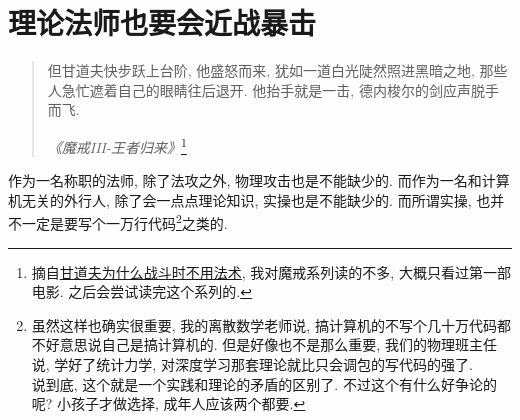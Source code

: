 % 
% 
% 

\section{理论法师也要会近战暴击}
\begin{quotation}
  但甘道夫快步跃上台阶, 他盛怒而来, 犹如一道白光陡然照进黑暗之地, 那些人急忙遮着自己的眼睛往后退开. 他抬手就是一击, 德内梭尔的剑应声脱手而飞. 

  \emph{《魔戒III-王者归来》}\footnote{摘自\href{https://lotr.huijiwiki.com/wiki/FAQ/甘道夫为什么战斗时不用法术？}{甘道夫为什么战斗时不用法术}, 我对魔戒系列读的不多, 大概只看过第一部电影. 之后会尝试读完这个系列的. }
\end{quotation}

作为一名称职的法师, 除了法攻之外, 物理攻击也是不能缺少的. 而作为一名和计算机无关的外行人, 除了会一点点理论知识, 实操也是不能缺少的. 而所谓实操, 也并不一定是要写个一万行代码\footnote{虽然这样也确实很重要, 我的离散数学老师说, 搞计算机的不写个几十万代码都不好意思说自己是搞计算机的. 但是好像也不是那么重要, 我们的物理班主任说, 学好了统计力学, 对深度学习那套理论就比只会调包的写代码的强了. \\说到底, 这个就是一个实践和理论的矛盾的区别了. 不过这个有什么好争论的呢? 小孩子才做选择, 成年人应该两个都要. }之类的. 

